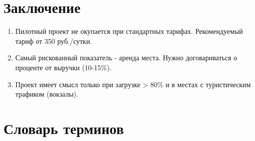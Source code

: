 \documentclass[12pt,a4paper]{article}
\begin{document}
\section{Заключение }
\begin{enumerate}
    \item Пилотный проект не окупается при стандартных тарифах. Рекомендуемый тариф от 350 руб./сутки.
    \item Самый рискованный показатель - аренда места. Нужно договариваться о проценте от выручки (10-15\%).
    \item Проект имеет смысл только при загрузке > 80\% и в местах с туристическим трафиком (вокзалы).
\end{enumerate}


\newpage
\section*{Словарь терминов}
\end{document}
